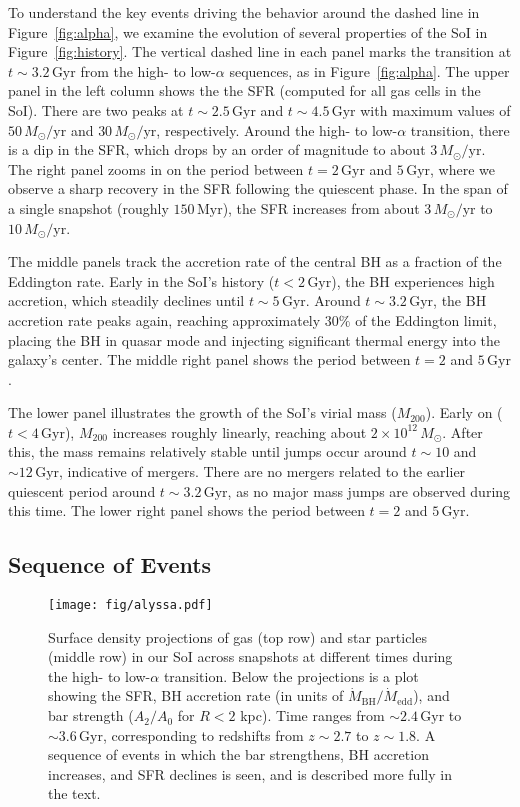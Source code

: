 \documentclass[twocolumn]{aastex631}
\newcommand{\Msun}{\ensuremath{M_{\odot}}}
\newcommand{\Gyr}{\ensuremath{\textrm{Gyr}}}
\newcommand{\Myr}{\ensuremath{\textrm{Myr}}}
\begin{document}
To understand the key events driving the behavior around the dashed line in Figure~\ref{fig:alpha}, we examine the evolution of several properties of the SoI in Figure~\ref{fig:history}. The vertical dashed line in each panel marks the transition at $t\sim3.2\,\Gyr$ from the high- to low-$\alpha$ sequences, as in Figure~\ref{fig:alpha}. The upper panel in the left column shows the the SFR (computed for all gas cells in the SoI). There are two peaks at $t\sim2.5\,\Gyr$ and $t\sim4.5\,\Gyr$ with maximum values of $50\,\Msun/\textrm{yr}$ and $30\,\Msun/\textrm{yr}$, respectively. Around the high- to low-$\alpha$ transition, there is a dip in the SFR, which drops by an order of magnitude to about $3\,\Msun/\textrm{yr}$. The right panel zooms in on the period between $t=2\,\Gyr$ and $5\,\Gyr$, where we observe a sharp recovery in the SFR following the quiescent phase. In the span of a single snapshot (roughly $150\,\Myr$), the SFR increases from about $3\,\Msun/\textrm{yr}$ to $10\,\Msun/\textrm{yr}$.

The middle panels track the accretion rate of the central BH as a fraction of the Eddington rate. Early in the SoI's history ($t<2\,\Gyr$), the BH experiences high accretion, which steadily declines until $t\sim5\,\Gyr$. Around $t\sim3.2\,\Gyr$, the BH accretion rate peaks again, reaching approximately $30\%$ of the Eddington limit, placing the BH in quasar mode and injecting significant thermal energy into the galaxy's center. The middle right panel shows the period between $t=2$ and $5\,\Gyr$.

The lower panel illustrates the growth of the SoI's virial mass ($M_{200}$). Early on ($t<4\,\Gyr$), $M_{200}$ increases roughly linearly, reaching about $2 \times 10^{12}\,\Msun$. After this, the mass remains relatively stable until jumps occur around $t\sim10$ and $\sim12\,\Gyr$, indicative of mergers. There are no mergers related to the earlier quiescent period around $t\sim3.2\,\Gyr$, as no major mass jumps are observed during this time. The lower right panel shows the period between $t=2$ and $5\,\Gyr$.

\subsection{Sequence of Events}\label{ssec:sequence_of_events}
\begin{figure*}
  \centering
  \texttt{[image: fig/alyssa.pdf]}
  \caption{Surface density projections of gas (top row) and star particles (middle row) in our SoI across snapshots at different times during the high- to low-$\alpha$ transition. Below the projections is a plot showing the SFR, BH accretion rate (in units of $\dot{M}_{\textrm{BH}}/\dot{M}_{\textrm{edd}}$), and bar strength ($A_2/A_0$ for $R<2$ kpc). Time ranges from $\sim2.4\,\textrm{Gyr}$ to $\sim3.6\,\textrm{Gyr}$, corresponding to redshifts from $z\sim2.7$ to $z\sim1.8$. A sequence of events in which the bar strengthens, BH accretion increases, and SFR declines is seen, and is described more fully in the text.}
  \label{fig:seq}
\end{figure*}
\end{document}
